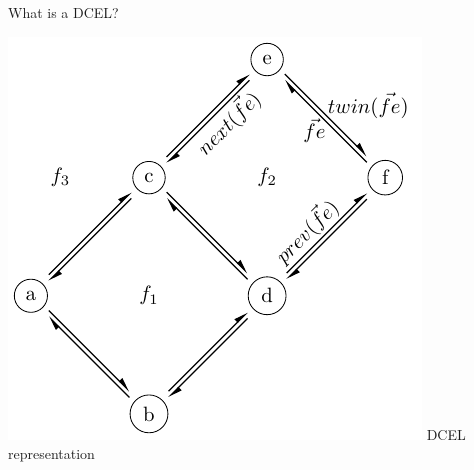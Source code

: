 \documentclass{beamer}
\begin{document}
\begin{frame}{What is a DCEL?}
\begin{minipage}{0.34\textwidth}
            \includegraphics[width=\textwidth]{figures/dcel_representation1}
            \tiny{DCEL representation}
        \end{minipage}
    \end{frame}
\end{document}
